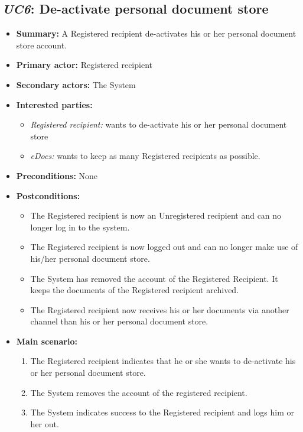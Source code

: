 \documentclass[a4paper,10pt]{article}
\begin{document}
\subsection{\emph{UC6}: De-activate personal document store}
\begin{itemize}
	\item \textbf{Summary:} A Registered recipient de-activates his or her personal document store account.
    \item \textbf{Primary actor:} Registered recipient
    \item \textbf{Secondary actors:} The System
    \item \textbf{Interested parties:}
        \begin{itemize}
            \item \textit{Registered recipient:} wants to de-activate his or her personal document store
            \item \textit{eDocs:} wants to keep as many Registered recipients as possible.
        \end{itemize}

    \item \textbf{Preconditions:} None

    \item \textbf{Postconditions:}
        \begin{itemize}
            \item The Registered recipient is now an Unregistered recipient and can no longer log in to the system.
            \item The Registered recipient is now logged out and can no longer make use of his/her personal document store.
            \item The System has removed the account of the Registered Recipient. It keeps the documents of the Registered recipient archived.
            \item The Registered recipient now receives his or her documents via another channel than his or her personal document store.
        \end{itemize}
        
    \item \textbf{Main scenario:} 
    \begin{enumerate}
       \item The Registered recipient indicates that he or she wants to de-activate his or her personal document store.
       \item The System removes the account of the registered recipient.
       \item The System indicates success to the Registered recipient and logs him or her out.
    \end{enumerate}


\end{itemize}
\end{document}

